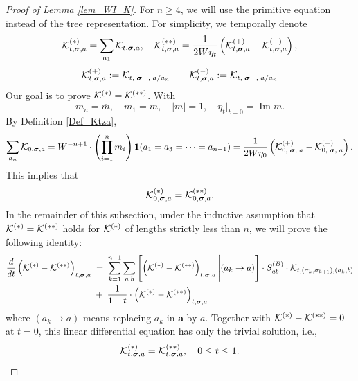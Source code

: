 \documentclass[10pt,reqno]{article}
\DeclareMathOperator{\im}{{\mathrm{Im}}}
\renewcommand{\bar}{\overline}
\theoremstyle{plain} %
\theoremstyle{remark}
\numberwithin{equation}{section}
\begin{document}
\begin{proof}[Proof of Lemma \ref{lem_WI_K}]
 For $n\ge 4$,   we will use the primitive equation instead of the tree representation. For simplicity, we temporally denote
 $$
{\cal K}^{(*)}_{t, \boldsymbol{\sigma}, \textbf{a}}
=\sum_{a_1}{\cal K} _{t, \boldsymbol{\sigma}, \textbf{a}},\quad
{\cal K}^{(**)}_{t, \boldsymbol{\sigma}, \textbf{a}}
=\frac1{2W\eta_t}\left({\cal K}^{(+)}_{t, \boldsymbol{\sigma}, \textbf{a}}-
{\cal K}^{(-)}_{t, \boldsymbol{\sigma}, \textbf{a}}\right),
$$
\begin{equation}\label{def_calKpm}
 {\cal K}^{(+)}_{t, \boldsymbol{\sigma}, \textbf{a}}: = {\cal K}_{t, \; \boldsymbol{\sigma}+,  \; \textbf{a}/a_n}
\quad\quad 
{\cal K}^{(-)}_{t, \boldsymbol{\sigma}, \textbf{a}}: = {\cal K}_{t, \; \boldsymbol{\sigma}-,  \; \textbf{a}/a_n}
   \end{equation}
Our goal is  to prove ${\cal K}^{(*)}={\cal K}^{(**)}$.  With
 $$
 m_n=\bar m, \quad m_1= m, \quad |m|=1, \quad \eta_t\big|_{t=0}=\im m. 
 $$
By Definition  \ref{Def_Ktza},    
 $$
  \sum_{a_n}{\cal K}_{0, \boldsymbol{\sigma}, \textbf{a}}=W^{-n+1}\cdot \left(\prod_{i=1}^n m_i \right){\bf 1}(a_1=a_3=\cdots =a_{n-1}) 
  =
  \frac{1}{2W\eta_0}\left(
  {\cal K}^{(+)}_{0,\; \boldsymbol{\sigma},\; \textbf{a}}
  - 
  {\cal K}^{(-)}_{0,\; \boldsymbol{\sigma},\; \textbf{a}}
  \right) .
 $$
This implies that 
 $${\cal K}^{(*)}_{0, \boldsymbol{\sigma}, \textbf{a}} ={\cal K}^{(**)}_{0, \boldsymbol{\sigma}, \textbf{a}}.$$
 In the remainder of this subsection,  under the inductive assumption that ${\cal K}^{(*)} ={\cal K} ^{(**)}$ holds for ${\cal K}^{(*)}$ of lengths strictly less than $n$,  we will  prove  the following identity: 
  \begin{align}\label{finK*-K}
     \frac d{dt}\left({\cal K}^{(*)}-{\cal K}^{(**)}\right)_{t, \boldsymbol{\sigma}, \textbf{a}} &\;=\;\sum_{ k=1}^{n-1} \sum_{a\;b}
        \left[\left({\cal K}^{(*)}-{\cal K}^{(**)}\right)_{t, \boldsymbol{\sigma}, \textbf{a}}\Bigg|(a_k\to a)\right]
        \cdot S^{(B)}_{ab}\cdot  {\cal K}_{t, ( \sigma _k,  \sigma _{k+1}), (a_k,b)}
        \\\nonumber
       &\;+\; \frac1{1-t}\cdot \left({\cal K}^{(*)}-{\cal K}^{(**)}\right)_{t, \boldsymbol{\sigma}, \textbf{a}} 
 \end{align}
 where $(a_k\to a)$ means replacing $a_k$ in $\textbf{a}$ by $a$.  Together with ${\cal K}^{(*)}-{\cal K}^{(**)}=0$ at $t=0$, this linear differential equation  has only the trivial solution, i.e., 
$$
{\cal K}^{(*)}_{t, \boldsymbol{\sigma}, \textbf{a}} ={\cal K}^{(**)}_{t, \boldsymbol{\sigma}, \textbf{a}}, \quad 0\le t\le 1.
$$
 

\end{proof}
\end{document}
